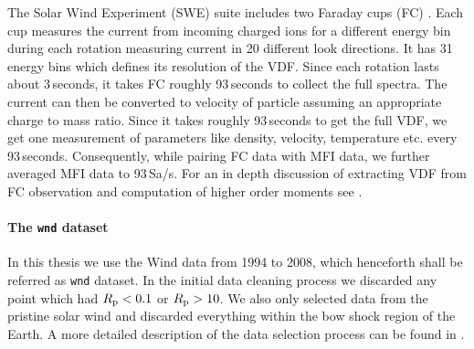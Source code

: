                 The Solar Wind Experiment (SWE) suite includes two Faraday cups (FC)
                \citep{Ogilvie1995}. Each cup measures the current from incoming charged ions for a
                different energy bin during each rotation measuring current in 20 different look
                directions. It has 31\,energy bins which defines its resolution of the VDF. Since
                each rotation lasts about 3\,seconds, it takes FC roughly 93\,seconds to collect the
                full spectra. The current can then be converted to velocity of particle assuming an
                appropriate charge to mass ratio. Since it takes roughly 93\,seconds to get the full
                VDF, we get one measurement of parameters like density, velocity, temperature etc.
                every 93\,seconds. Consequently, while pairing FC data with MFI data, we further
                averaged MFI data to 93\,Sa/s. For an in depth discussion of extracting VDF from FC
                observation and computation of higher order moments see \citet{Maruca2012a}.

            \paragraph*{The \texttt{wnd} dataset} \label{sec:wndds}

                In this thesis we use the Wind data from 1994 to 2008, which henceforth shall be
                referred as \texttt{wnd} dataset. In the initial data cleaning process we discarded
                any point which had $R_{\rm p} < 0.1$ or $R_{\rm p} > 10$. We also only selected
                data from the pristine solar wind and discarded everything within the bow shock
                region of the Earth. A more detailed description of the data selection process can
                be found in \citet[\S4.1]{Maruca2012a}.

